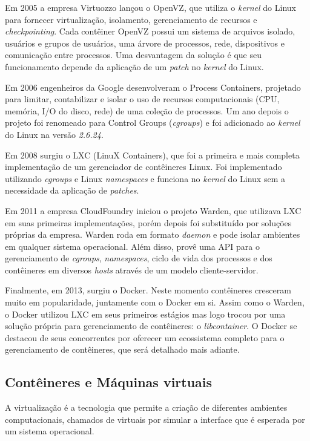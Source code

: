 	Em 2005 a empresa Virtuozzo lançou o OpenVZ, que utiliza o \textit{kernel} do Linux para fornecer virtualização, isolamento, gerenciamento de recursos e \textit{checkpointing}. Cada contêiner OpenVZ possui um sistema de arquivos isolado, usuários e grupos de usuários, uma árvore de processos, rede, dispositivos e comunicação entre processos. Uma desvantagem da solução é que seu funcionamento depende da aplicação de um \textit{patch} no \textit{kernel} do Linux. \cite{openvz}

	Em 2006 engenheiros da Google desenvolveram o Process Containers, projetado para limitar, contabilizar e isolar o uso de recursos computacionais (CPU, memória, I/O do disco, rede) de uma coleção de processos. Um ano depois o projeto foi renomeado para Control Groups (\textit{cgroups}) e foi adicionado ao \textit{kernel} do Linux na versão \textit{2.6.24}.

	Em 2008 surgiu o LXC (LinuX Containers), que foi a primeira e mais completa implementação de um gerenciador de contêineres Linux. Foi implementado utilizando \textit{cgroups} e Linux \textit{namespaces} e funciona no \textit{kernel} do Linux sem a necessidade da aplicação de \textit{patches}.
	
	Em 2011 a empresa CloudFoundry iniciou o projeto Warden, que utilizava LXC em suas primeiras implementações, porém depois foi substituído por soluções próprias da empresa. Warden roda em formato \textit{daemon} e pode isolar ambientes em qualquer sistema operacional. Além disso, provê uma API para o gerenciamento de \textit{cgroups}, \textit{namespaces}, ciclo de vida dos processos e dos contêineres em diversos \textit{hosts} através de um modelo cliente-servidor.

	Finalmente, em 2013, surgiu o Docker. Neste momento contêineres cresceram muito em popularidade, juntamente com o Docker em si.
	Assim como o Warden, o Docker utilizou LXC em seus primeiros estágios mas logo trocou por uma solução própria para gerenciamento de contêineres: o \textit{libcontainer}.
	O Docker se destacou de seus concorrentes por oferecer um ecossistema completo para o gerenciamento de contêineres, que será detalhado mais adiante.
	
	\subsection{Contêineres e Máquinas virtuais}
	
	A virtualização é a tecnologia que permite a criação de diferentes ambientes computacionais, chamados de virtuais por simular a interface que é esperada por um sistema operacional.
	
